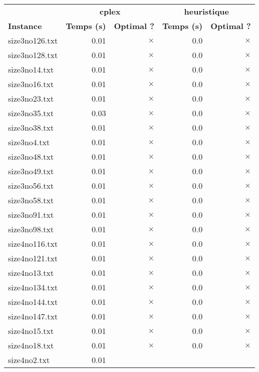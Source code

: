 \documentclass{article}
\begin{document}
\newpage
\begin{center}
\renewcommand{\arraystretch}{1.4} 
 \begin{tabular}{lrrrr}
	\hline
 & \multicolumn{2}{c}{\textbf{cplex}} & \multicolumn{2}{c}{\textbf{heuristique}}\\
\textbf{Instance}  & \textbf{Temps (s)} & \textbf{Optimal ?}  & \textbf{Temps (s)} & \textbf{Optimal ?} \\\hline

size3no126.txt & 0.01 & 
$\times$
 & 0.0 & 
$\times$
\\
size3no128.txt & 0.01 & 
$\times$
 & 0.0 & 
$\times$
\\
size3no14.txt & 0.01 & 
$\times$
 & 0.0 & 
$\times$
\\
size3no16.txt & 0.01 & 
$\times$
 & 0.0 & 
$\times$
\\
size3no23.txt & 0.01 & 
$\times$
 & 0.0 & 
$\times$
\\
size3no35.txt & 0.03 & 
$\times$
 & 0.0 & 
$\times$
\\
size3no38.txt & 0.01 & 
$\times$
 & 0.0 & 
$\times$
\\
size3no4.txt & 0.01 & 
$\times$
 & 0.0 & 
$\times$
\\
size3no48.txt & 0.01 & 
$\times$
 & 0.0 & 
$\times$
\\
size3no49.txt & 0.01 & 
$\times$
 & 0.0 & 
$\times$
\\
size3no56.txt & 0.01 & 
$\times$
 & 0.0 & 
$\times$
\\
size3no58.txt & 0.01 & 
$\times$
 & 0.0 & 
$\times$
\\
size3no91.txt & 0.01 & 
$\times$
 & 0.0 & 
$\times$
\\
size3no98.txt & 0.01 & 
$\times$
 & 0.0 & 
$\times$
\\
size4no116.txt & 0.01 & 
$\times$
 & 0.0 & 
$\times$
\\
size4no121.txt & 0.01 & 
$\times$
 & 0.0 & 
$\times$
\\
size4no13.txt & 0.01 & 
$\times$
 & 0.0 & 
$\times$
\\
size4no134.txt & 0.01 & 
$\times$
 & 0.0 & 
$\times$
\\
size4no144.txt & 0.01 & 
$\times$
 & 0.0 & 
$\times$
\\
size4no147.txt & 0.01 & 
$\times$
 & 0.0 & 
$\times$
\\
size4no15.txt & 0.01 & 
$\times$
 & 0.0 & 
$\times$
\\
size4no18.txt & 0.01 & 
$\times$
 & 0.0 & 
$\times$
\\
size4no2.txt & 0.01 & 

\end{tabular}
\end{center}
\end{document}
